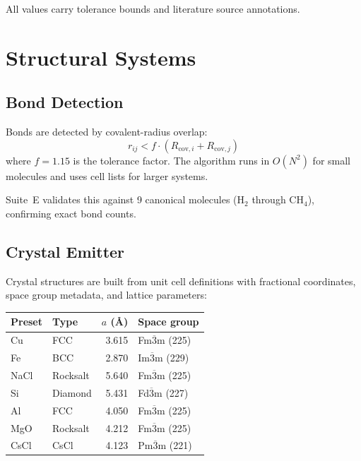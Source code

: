 \documentclass[11pt,twoside]{article}
\begin{document}
All values carry tolerance bounds and literature source annotations.


\section{Structural Systems}
\label{sec:structural}

\subsection{Bond Detection}

Bonds are detected by covalent-radius overlap:
\begin{equation}
  r_{ij} < f \cdot (R_{\mathrm{cov},i} + R_{\mathrm{cov},j})
\end{equation}
where $f = 1.15$ is the tolerance factor.  The algorithm runs in
$O(N^2)$ for small molecules and uses cell lists for larger systems.

Suite~E validates this against 9 canonical molecules (H$_2$ through CH$_4$),
confirming exact bond counts.

\subsection{Crystal Emitter}

Crystal structures are built from unit cell definitions with fractional
coordinates, space group metadata, and lattice parameters:

\begin{center}
\begin{tabular}{llrl}
\toprule
\textbf{Preset} & \textbf{Type} & \textbf{$a$ (\AA)} & \textbf{Space group} \\
\midrule
Cu  & FCC      & 3.615 & Fm$\overline{3}$m (225) \\
Fe  & BCC      & 2.870 & Im$\overline{3}$m (229) \\
NaCl & Rocksalt & 5.640 & Fm$\overline{3}$m (225) \\
Si  & Diamond  & 5.431 & Fd$\overline{3}$m (227) \\
Al  & FCC      & 4.050 & Fm$\overline{3}$m (225) \\
MgO & Rocksalt & 4.212 & Fm$\overline{3}$m (225) \\
CsCl & CsCl    & 4.123 & Pm$\overline{3}$m (221) \\
\bottomrule
\end{tabular}
\end{center}
\end{document}
